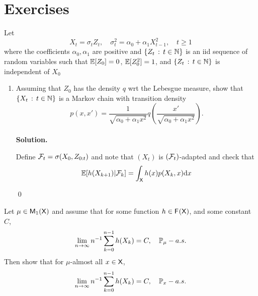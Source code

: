 \documentclass[english,graybox,envcountchap,envcountsame,sectrefs,shortlabels]{svmono}
\theoremstyle{style}
\newenvironment{answer}{\noindent \\ \textbf{Solution.}\begin{leftbar} \footnotesize}{\hfill \qed \end{leftbar}}
\begin{document}
\section{Exercises}
\begin{exercise}
\label{ex:arch}
Let
\[
X_{t}=\sigma_{t}Z_{t},\quad\sigma_{t}^2=\alpha_{0}+\alpha_{1}X_{t-1}^{2},\quad t\geq1
\]
where the coefficients $\alpha_{0},\alpha_{1}$ are positive and $\left\{ Z_{t}\,:\,t\in\mathbb{N}\right\}$
is an iid sequence of random variables such that $\mathbb{E}[Z_{0}]=0$,
$\mathbb{E}[Z_{0}^{2}]=1$, and $\left\{ Z_{t}\,:\,t\in\mathbb{N}\right\}$ is
independent of $X_{0}$
\begin{enumerate}
\item Assuming that $Z_{0}$ has the density $q$ wrt the Lebesgue measure,
show that $\left\{ X_{t}\,:\,t\in\mathbb{N}\right\}$ is a Markov chain with transition
density
\[
p(x,x')=\frac{1}{\sqrt{\alpha_{0}+\alpha_{1}x^{2}}}q\left(\frac{x'}{\sqrt{\alpha_{0}+\alpha_{1}x^{2}}}\right).
\]
\begin{answer}
Define $\mathcal{F}_t=\sigma(X_0,Z_{0:t})$ and note that $(X_t)$ is $(\mathcal{F}_t)$-adapted and check that
$$
\mathbb{E}[h(X_{k+1})|\mathcal{F}_k]=\int_{\mathsf{X}} h(x) p(X_k,x)\mathrm{d} x
$$

\end{answer}

\end{enumerate}
\end{exercise}

\begin{exercise} \label{exo:solidarite}
Let $\mu\in\mathsf{M}_{1}(\mathsf{X})$ and assume that for some function $h\in\mathsf{F_{}}(\mathsf{X})$, and some constant $C$,
$$
\lim_{n\to \infty} n^{-1} \sum_{k=0}^{n-1} h(X_k)=C,\quad \mathbb{P}_\mu-a.s.
$$
Then show that for $\mu$-almost all $x\in\mathsf{X}$,
$$
\lim_{n\to \infty} n^{-1} \sum_{k=0}^{n-1} h(X_k)=C,\quad \mathbb{P}_x-a.s.
$$
\end{exercise}
\end{document}
